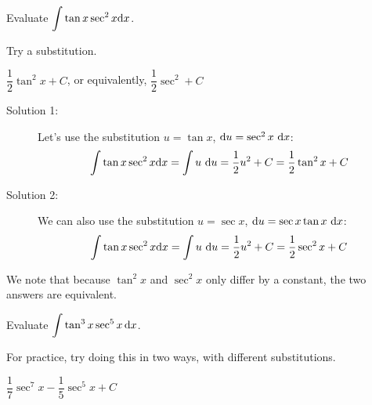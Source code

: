 \begin{Mquestion}
Evaluate $\displaystyle\int \tan x \sec^2 x \mathrm{d}x$.
\end{Mquestion}
\begin{hint}
Try a substitution.
\end{hint}
\begin{answer}
$\dfrac{1}{2}\tan^2 x+C$, or equivalently, $\dfrac{1}{2}\sec^2  +C$
\end{answer}
\begin{solution}
\begin{description}
\item[Solution 1:] Let's use the substitution $u=\tan x$, $\mathrm{d}u = \sec^2 x~\mathrm{d}x$:
\[\int \tan x \sec^2 x \mathrm{d}x = \int u~\mathrm{d}u = \frac{1}{2}u^2+C = \frac{1}{2}\tan^2 x +C\]
\item[Solution 2:]
We can also use the substitution $u=\sec x$, $\mathrm{d}u = \sec x \tan x~\mathrm{d}x$:
\[ \int\tan x \sec^2 x \mathrm{d}x = \int u~\mathrm{d}u = \frac{1}{2}u^2+C = \frac{1}{2}\sec^2 x +C\]
\end{description}
We note that because $\tan^2x$ and $\sec^2 x$ only differ by a constant, the two answers are equivalent.
\end{solution}
\begin{Mquestion}[2015A]\label{1.8tansec1}
Evaluate $\displaystyle\int \tan^3 x \sec^5x \,\mathrm{d}x$.
\end{Mquestion}

\begin{hint}
For practice, try doing this in two ways, with different
substitutions.
\end{hint}

\begin{answer}
$\dfrac{1}{7}\sec^7 x -\dfrac{1}{5}\sec^5 x + C$
\end{answer}


